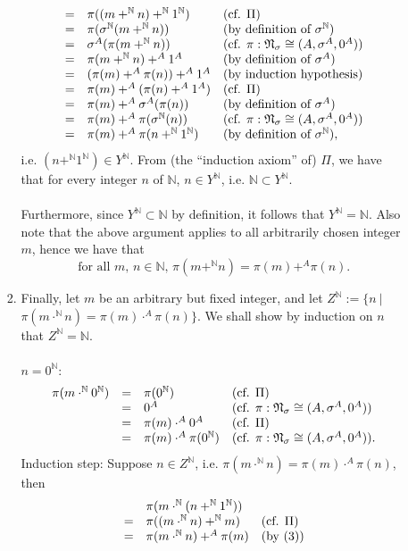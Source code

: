 \begin{enumerate}[1.]
\begin{enumerate}[(a)]
\begin{enumerate}[1)]
\[\begin{array}{lll}
= & \pi((m +^\mathbb{N} n) +^\mathbb{N} 1^\mathbb{N}) & \mbox{(cf. $\Pi$)} \cr
= & \pi(\sigma^\mathbb{N}(m +^\mathbb{N} n)) & \mbox{(by definition of $\sigma^\mathbb{N}$)} \cr
= & \sigma^A(\pi(m +^\mathbb{N} n)) & \mbox{(cf. $\pi: \mathfrak{N}_\sigma \cong (A, \sigma^A, 0^A)$)} \cr
= & \pi(m +^\mathbb{N} n) +^A 1^A & \mbox{(by definition of $\sigma^A$)} \cr
= & (\pi(m) +^A \pi(n)) +^A 1^A & \mbox{(by induction hypothesis)} \cr
= & \pi(m) +^A (\pi(n) +^A 1^A) & \mbox{(cf. $\Pi$)} \cr
= & \pi(m) +^A \sigma^A(\pi(n)) & \mbox{(by definition of $\sigma^A$)} \cr
= & \pi(m) +^A \pi(\sigma^\mathbb{N}(n)) & \mbox{(cf. $\pi: \mathfrak{N}_\sigma \cong (A, \sigma^A, 0^A)$)} \cr
= & \pi(m) +^A \pi(n +^\mathbb{N} 1^\mathbb{N}) & \mbox{(by definition of $\sigma^\mathbb{N}$)},
\end{array}
\]
i.e. $(n +^\mathbb{N} 1^\mathbb{N}) \in Y^\mathbb{N}$. From (the ``induction axiom'' of) $\Pi$, we have that for every integer $n$ of $\mathbb{N}$, $n \in Y^\mathbb{N}$, i.e. $\mathbb{N} \subset Y^\mathbb{N}$.\\
\\
Furthermore, since $Y^\mathbb{N} \subset \mathbb{N}$ by definition, it follows that $Y^\mathbb{N} = \mathbb{N}$. Also note that the above argument applies to all arbitrarily chosen integer $m$, hence we have that
\[
\mbox{for all $m$, $n \in \mathbb{N}$, $\pi(m +^\mathbb{N} n) = \pi(m) +^A \pi(n)$}.
\]
\item Finally, let $m$ be an arbitrary but fixed integer, and let $Z^\mathbb{N} := \{ n \ |$\\$\pi(m \cdot^\mathbb{N} n) = \pi(m) \cdot^A \pi(n) \}$. We shall show by induction on $n$ that $Z^\mathbb{N} = \mathbb{N}$.\\
\\
$n = 0^\mathbb{N}$:
\[
\begin{array}{llll}
\pi(m \cdot^\mathbb{N} 0^\mathbb{N}) & = & \pi(0^\mathbb{N}) & \mbox{(cf. $\Pi$)} \cr
\ & = & 0^A & \mbox{(cf. $\pi: \mathfrak{N}_\sigma \cong (A, \sigma^A, 0^A)$)} \cr
\ & = & \pi(m) \cdot^A 0^A & \mbox{(cf. $\Pi$)} \cr
\ & = & \pi(m) \cdot^A \pi(0^\mathbb{N}) & \mbox{(cf. $\pi: \mathfrak{N}_\sigma \cong (A, \sigma^A, 0^A)$)}.
\end{array}
\]
Induction step: Suppose $n \in Z^\mathbb{N}$, i.e. $\pi(m \cdot^\mathbb{N} n) = \pi(m) \cdot^A \pi(n)$, then
\[
\begin{array}{lll}
\ & \pi(m \cdot^\mathbb{N} (n +^\mathbb{N} 1^\mathbb{N})) & \ \cr
= & \pi((m \cdot^\mathbb{N} n) +^\mathbb{N} m) & \mbox{(cf. $\Pi$)} \cr
= & \pi(m \cdot^\mathbb{N} n) +^A \pi(m) & \mbox{(by (3))} \cr

\end{array}\]
\end{enumerate}
\end{enumerate}
\end{enumerate}
